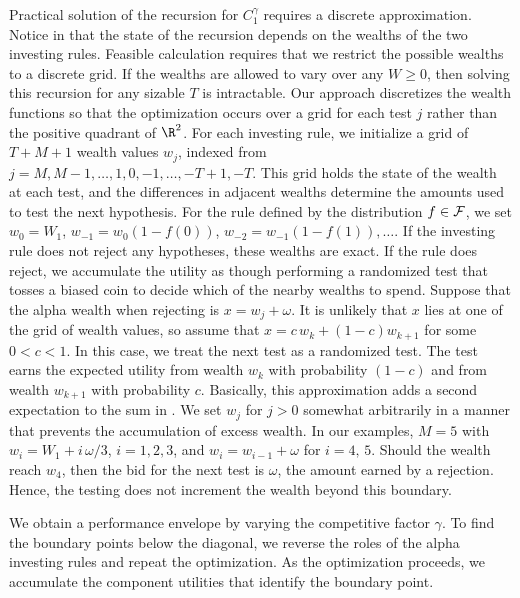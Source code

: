 \documentclass[12pt]{article}
\begin{document}
 Practical solution of the recursion for $C_1^\gamma$ requires a discrete
 approximation.  Notice in  that the state of the recursion depends
 on the wealths of the two investing rules. Feasible calculation requires that
 we restrict the possible wealths to a discrete grid.  If the wealths are
 allowed to vary over any $W \ge 0$, then solving this recursion for any sizable
 $T$ is intractable.  Our approach discretizes the wealth functions so that the
 optimization occurs over a grid for each test $j$ rather than the positive
 quadrant of $\R^2$.  For each investing rule, we initialize a grid of $T+M+1$
 wealth values $w_j$, indexed from $j=M, M-1, \ldots, 1, 0, -1, \ldots, -T+1,
 -T$.  This grid holds the state of the wealth at each test, and the differences
 in adjacent wealths determine the amounts used to test the next hypothesis.
  For the rule defined by the distribution $f \in {\cal F}$, we set $w_0 = W_1$,
 $w_{-1} = w_0(1-f(0))$, $w_{-2} = w_{-1}(1-f(1)), \ldots$.  If the investing
 rule does not reject any hypotheses, these wealths are exact.  If the rule does
 reject, we accumulate the utility as though performing a randomized test that
 tosses a biased coin to decide which of the nearby wealths to spend.  Suppose
 that the alpha wealth when rejecting is $x = w_j + \omega$.  It is unlikely
 that $x$ lies at one of the grid of wealth values, so assume that $x = c \, w_k
 + (1-c) w_{k+1}$ for some $0 < c < 1$.  In this case, we treat the next test as
 a randomized test.  The test earns the expected utility from wealth $w_k$ with
 probability $(1-c)$ and from wealth $w_{k+1}$ with probability $c$. Basically,
 this approximation adds a second expectation to the sum in . We
 set $w_j$ for $j > 0$ somewhat arbitrarily in a manner that prevents the
 accumulation of excess wealth.  In our examples, $M=5$ with $w_i = W_1 + i
 \,\omega/3$, $i=1,2,3$, and $w_i = w_{i-1} + \omega$ for $i=4,\,5$.  Should the
 wealth reach $w_4$, then the bid for the next test is $\omega$, the amount
 earned by a rejection.  Hence, the testing does not increment the wealth beyond
 this boundary.
 

 We obtain a performance envelope by varying the competitive factor $\gamma$.
  To find the boundary points below the diagonal, we reverse the roles of the
 alpha investing rules and repeat the optimization.  As the optimization
 proceeds, we accumulate the component utilities that identify the boundary
 point.



\end{document}
